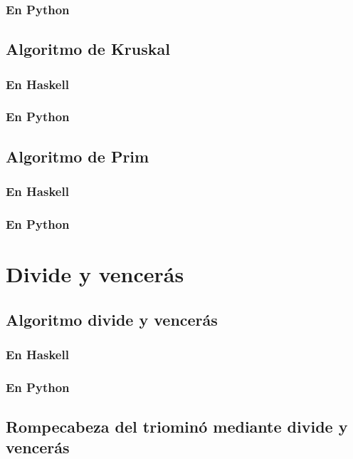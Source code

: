 \documentclass[a4paper,12pt,twoside]{book}
\begin{document}
\subsection{En Python}

\section{Algoritmo de Kruskal}
\subsection{En Haskell}
\subsection{En Python}

\section{Algoritmo de Prim}
\subsection{En Haskell}
\subsection{En Python}

\chapter{Divide y vencerás}

\minitoc

\section{Algoritmo divide y vencerás}
\subsection{En Haskell}
\subsection{En Python}

\section{Rompecabeza del triominó mediante divide y vencerás}
\end{document}
